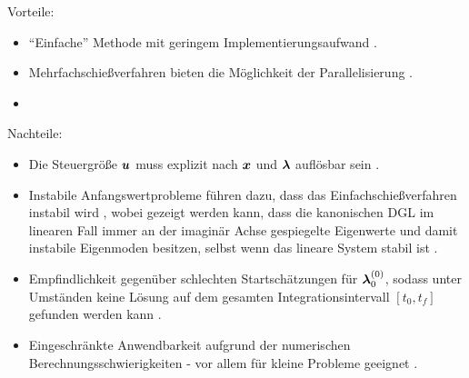 \begin{multicols}{2}
	Vorteile:
	\begin{itemize}
		\item ``Einfache'' Methode mit geringem Implementierungsaufwand \cite{Ascher.1995c4}.
		\item Mehrfachschießverfahren bieten die Möglichkeit der Parallelisierung \cite{Betts.1998}.\vspace{\fill}
		\item[\vspace{\fill}]
	\end{itemize}
	
	\columnbreak
	
	Nachteile:
	\begin{itemize}
		\item Die Steuergröße $\boldsymbol{u}$ muss explizit nach $\boldsymbol{x}$ und $\boldsymbol{\lambda}$ auflösbar sein \cite{Papageorgiou.2012}.\vspace{\fill}
		\item Instabile Anfangswertprobleme führen dazu, dass das Einfachschießverfahren instabil wird \cite{Ascher.1995c4}, wobei gezeigt werden kann, dass die kanonischen \gls{DGL} im linearen Fall immer an der imaginär Achse gespiegelte Eigenwerte und damit instabile Eigenmoden besitzen, selbst wenn das lineare System stabil ist \cite{KnutGraichen.2012}. 
		\item Empfindlichkeit gegenüber schlechten Startschätzungen für $\boldsymbol{\lambda}_0^{(0)}$, sodass unter Umständen keine Lösung auf dem gesamten Integrationsintervall $[t_0, t_f]$ gefunden werden kann \cite{Ascher.1995c4}.
		\item Eingeschränkte Anwendbarkeit aufgrund der numerischen Berechnungsschwierigkeiten - vor allem für kleine Probleme geeignet \cite{Papageorgiou.2012}.
	\end{itemize}
\end{multicols}

